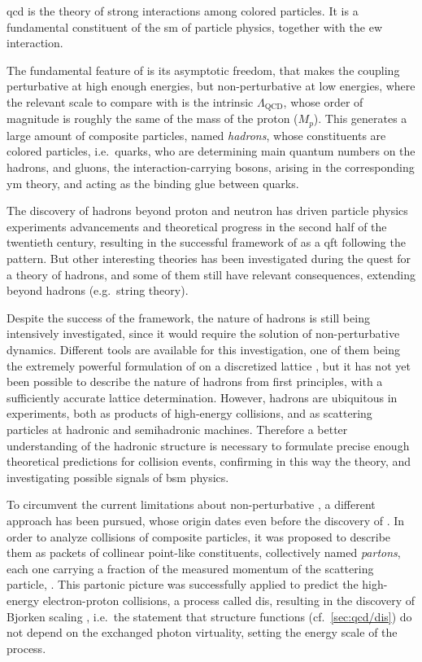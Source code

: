 \acrfull{qcd} is the theory of strong interactions among colored particles.
It is a fundamental constituent of the \acrfull{sm} of particle physics,
together with the \acrfull{ew} interaction.

The fundamental feature of \qcd is its asymptotic freedom, that makes the
coupling perturbative at high enough energies, but non-perturbative at low
energies, where the relevant scale to compare with is the intrinsic
$\Lambda_{\text{QCD}}$, whose order of magnitude is roughly the same of the
mass of the proton ($M_p$).
%
This generates a large amount of composite particles, named \textit{hadrons},
whose constituents are colored particles, i.e.\ quarks, who are determining
main quantum numbers on the hadrons, and gluons, the interaction-carrying
bosons, arising in the corresponding \acrfull{ym} theory, and acting as the
binding glue between quarks.

The discovery of hadrons beyond proton and neutron has driven particle physics
experiments advancements and theoretical progress in the second half of the
twentieth century, resulting in the successful framework of \qcd as a
\acrlong{qft} following the \ym pattern.
But other interesting theories has been investigated during the quest for a
theory of hadrons, and some of them still have relevant consequences, extending
beyond hadrons (e.g.\ string theory).

Despite the success of the framework, the nature of hadrons is still being
intensively investigated, since it would require the solution of
non-perturbative \qcd dynamics.
%
Different tools are available for this investigation, one of them being the
extremely powerful formulation of \qcd on a discretized lattice
\cite{Wilson:1974sk}, but it has not yet been possible to describe the nature
of hadrons from first principles, with a sufficiently accurate lattice
determination.
%
However, hadrons are ubiquitous in \hep experiments, both as products of
high-energy collisions, and as scattering particles at hadronic and
semihadronic machines.
Therefore a better understanding of the hadronic structure is necessary to
formulate precise enough theoretical predictions for collision events,
confirming in this way the \sm theory, and investigating possible signals of
\acrfull{bsm} physics.

To circumvent the current limitations about non-perturbative \qft, a different
approach has been pursued, whose origin dates even before the discovery of
\qcd.
In order to analyze collisions of composite particles, it was proposed to
describe them as packets of collinear point-like constituents, collectively
named \textit{partons}, each one carrying a fraction of the measured momentum
of the scattering particle, \cite{Feynman:1969wa}.
%
This partonic picture was successfully applied to predict the high-energy
electron-proton collisions, a process called \acrfull{dis}, resulting in the
discovery of Bjorken scaling \cite{Bjorken:1967fb}, i.e.\ the statement that
\dis structure functions (cf.\ \cref{sec:qcd/dis}) do not depend on the
exchanged photon virtuality, setting the energy scale of the process.

